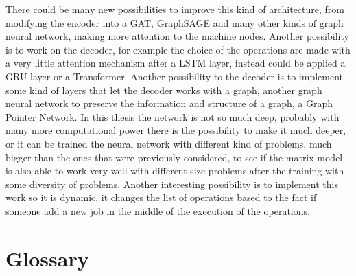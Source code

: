 \documentclass[12pt]{book}
\begin{document}
There could be many new possibilities to improve this kind of architecture, from modifying the encoder into a GAT, GraphSAGE\cite{Hamilton2017} and many other kinds of graph neural network, making more attention to the machine nodes. Another possibility is to work on the decoder, for example the choice of the operations are made with a very little attention mechanism after a LSTM layer, instead could be applied a GRU layer or a Transformer. Another possibility to the decoder is to implement some kind of layers that let the decoder works with a graph, another graph neural network to preserve the information and structure of a graph, a Graph Pointer Network. In this thesis the network is not so much deep, probably with many more computational power there is the possibility to make it much deeper, or it can be trained the neural network with different kind of problems, much bigger than the ones that were previously considered, to see if the matrix model is also able to work very well with different size problems after the training with some diversity of problems. Another interesting possibility is to implement this work so it is dynamic, it changes the list of operations based to the fact if someone add a new job in the middle of the execution of the operations.

\appendix 

\chapter*{Glossary}
\end{document}
